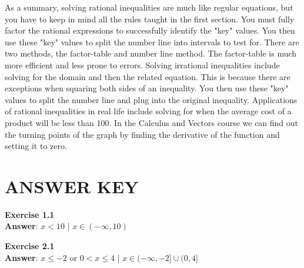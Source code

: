 \documentclass[12pt,fleqn]{book} %
\begin{document}
\noindent As a summary, solving rational inequalities are much like regular equations, but you have to keep in mind all the rules taught in the first section. You must fully factor the rational expressions to successfully identify the "key" values. You then use these "key" values to split the number line into intervals to test for. There are two methods, the factor-table and number line method. The factor-table is much more efficient and less prone to errors. Solving irrational inequalities include solving for the domain and then the related equation. This is because there are exceptions when squaring both sides of an inequality. You then use these "key" values to split the number line and plug into the original inequality. Applications of rational inequalities in real life include solving for when the average cost of a product will be less than 100.  In the Calculus and Vectors course we can find out the turning points of the graph by finding the derivative of the function and setting it to zero. 


\section{ANSWER KEY}

\Large{\textbf{Exercise 1.1}}\\
\large{\textbf{Answer}: $x<10$ \hspace{5mm} | \hspace{5mm} $x\in(-\infty,10)$}\\

\vspace{4mm}

\noindent\Large{\textbf{Exercise 2.1}}\\
\large{\textbf{Answer}: $x\leq-2$ or $0<x\leq4$ \hspace{5mm} | \hspace{5mm} $x\in(-\infty,-2]\cup(0,4]$}\\


\cleardoublepage %
\setlength{\columnsep}{0.75cm} %
\printindex %

\end{document}
